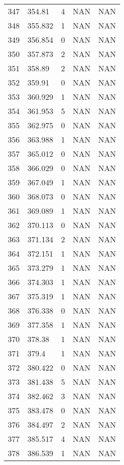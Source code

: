 \documentclass{article}
\begin{document}
\begin{longtable}{@{}lllll@{}}
				347 & 354.81  & 4    & NAN  & NAN  \\
				348 & 355.832 & 1    & NAN  & NAN  \\
				349 & 356.854 & 0    & NAN  & NAN  \\
				350 & 357.873 & 2    & NAN  & NAN  \\
				351 & 358.89  & 2    & NAN  & NAN  \\
				352 & 359.91  & 0    & NAN  & NAN  \\
				353 & 360.929 & 1    & NAN  & NAN  \\
				354 & 361.953 & 5    & NAN  & NAN  \\
				355 & 362.975 & 0    & NAN  & NAN  \\
				356 & 363.988 & 1    & NAN  & NAN  \\
				357 & 365.012 & 0    & NAN  & NAN  \\
				358 & 366.029 & 0    & NAN  & NAN  \\
				359 & 367.049 & 1    & NAN  & NAN  \\
				360 & 368.073 & 0    & NAN  & NAN  \\
				361 & 369.089 & 1    & NAN  & NAN  \\
				362 & 370.113 & 0    & NAN  & NAN  \\
				363 & 371.134 & 2    & NAN  & NAN  \\
				364 & 372.151 & 1    & NAN  & NAN  \\
				365 & 373.279 & 1    & NAN  & NAN  \\
				366 & 374.303 & 1    & NAN  & NAN  \\
				367 & 375.319 & 1    & NAN  & NAN  \\
				368 & 376.338 & 0    & NAN  & NAN  \\
				369 & 377.358 & 1    & NAN  & NAN  \\
				370 & 378.38  & 1    & NAN  & NAN  \\
				371 & 379.4   & 1    & NAN  & NAN  \\
				372 & 380.422 & 0    & NAN  & NAN  \\
				373 & 381.438 & 5    & NAN  & NAN  \\
				374 & 382.462 & 3    & NAN  & NAN  \\
				375 & 383.478 & 0    & NAN  & NAN  \\
				376 & 384.497 & 2    & NAN  & NAN  \\
				377 & 385.517 & 4    & NAN  & NAN  \\
				378 & 386.539 & 1    & NAN  & NAN  \\

\end{longtable}
\end{document}
